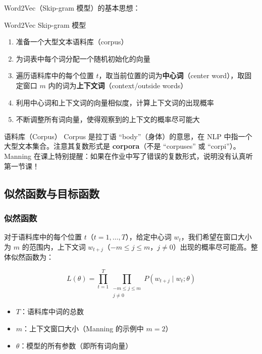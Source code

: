 \documentclass[a4paper]{article}
\begin{document}
Word2Vec（Skip-gram 模型）的基本思想：

\begin{importantbox}{Word2Vec Skip-gram 模型}
\begin{enumerate}
    \item 准备一个大型文本语料库（corpus）
    \item 为词表中每个词分配一个随机初始化的向量
    \item 遍历语料库中的每个位置 $t$，取当前位置的词为\textbf{中心词}（center word），取固定窗口 $m$ 内的词为\textbf{上下文词}（context/outside words）
    \item 利用中心词和上下文词的向量相似度，计算上下文词的出现概率
    \item 不断调整所有词向量，使得观察到的上下文的概率尽可能大
\end{enumerate}
\end{importantbox}

\begin{knowledgebox}{语料库（Corpus）}
Corpus 是拉丁语 ``body''（身体）的意思，在 NLP 中指一个大型文本集合。注意其复数形式是 \textbf{corpora}（不是 ``corpuses'' 或 ``corpi''）。Manning 在课上特别提醒：如果在作业中写了错误的复数形式，说明没有认真听第一节课！
\end{knowledgebox}

\subsection{似然函数与目标函数}

\subsubsection{似然函数}

对于语料库中的每个位置 $t$（$t = 1, \ldots, T$），给定中心词 $w_t$，我们希望在窗口大小为 $m$ 的范围内，上下文词 $w_{t+j}$（$-m \le j \le m$，$j \ne 0$）出现的概率尽可能高。整体似然函数为：

$$L(\theta) = \prod_{t=1}^{T} \prod_{\substack{-m \le j \le m \\ j \ne 0}} P(w_{t+j} \mid w_t; \theta)$$

\begin{itemize}
    \item $T$：语料库中词的总数
    \item $m$：上下文窗口大小（Manning 的示例中 $m=2$）
    \item $\theta$：模型的所有参数（即所有词向量）
\end{itemize}
\end{document}
